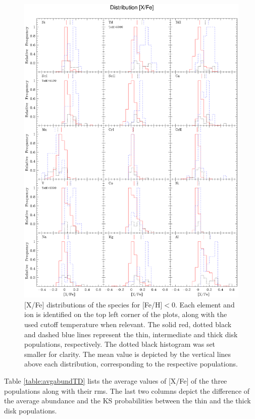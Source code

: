 \documentclass[oldversion]{aa}
\begin{document}
\begin{figure}[t!]
\centering
\includegraphics[trim=0cm 1.5cm 0cm 1cm,clip,width=17 cm]{pics/histxfepaperTD0.0v3.eps}
\caption[]{[X/Fe] distributions of the species for [Fe/H]$<0$. Each element and ion is identified on the top left corner of the plots, along with the used cutoff temperature when relevant. The solid red, dotted black and dashed blue lines represent the thin, intermediate and thick disk populations, respectively. The dotted black histogram was set smaller for clarity. The mean value is depicted by the vertical lines above each distribution, corresponding to the respective populations.}
\label{fig:histxfeTD}
\end{figure}



Table \ref{table:avgabundTD} lists the average values of [X/Fe] of the three populations along with their rms. The last two columns depict the difference of the average abundance and the KS probabilities between the thin and the thick disk populations.
\end{document}

